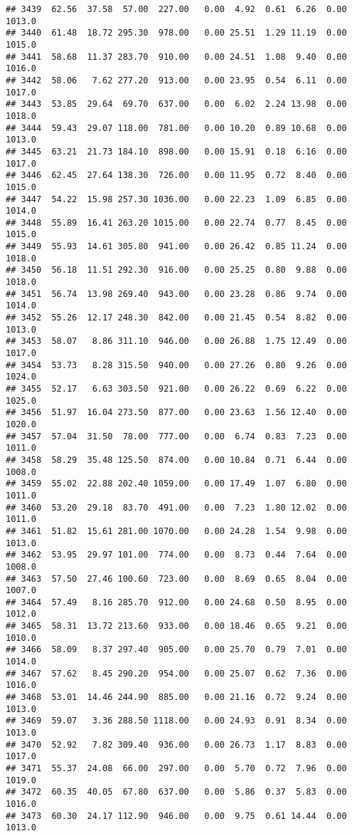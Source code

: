 \documentclass{article}\usepackage{graphicx, color}
\makeatletter
\newenvironment{kframe}{%
 \def\at@end@of@kframe{}%
 \ifinner\ifhmode%
  \def\at@end@of@kframe{\end{minipage}}%
  \begin{minipage}{\columnwidth}%
 \fi\fi%
 \def\FrameCommand##1{\hskip\@totalleftmargin \hskip-\fboxsep
 \colorbox{shadecolor}{##1}\hskip-\fboxsep
     \hskip-\linewidth \hskip-\@totalleftmargin \hskip\columnwidth}%
 \MakeFramed {\advance\hsize-\width
   \@totalleftmargin\z@ \linewidth\hsize
   \@setminipage}}%
 {\par\unskip\endMakeFramed%
 \at@end@of@kframe}
\newenvironment{knitrout}{}{} %
\makeatother
\begin{document}
\begin{knitrout}
\begin{kframe}
\begin{verbatim}
## 3439  62.56  37.58  57.00  227.00   0.00  4.92  0.61  6.26  0.00 1013.0
## 3440  61.48  18.72 295.30  978.00   0.00 25.51  1.29 11.19  0.00 1015.0
## 3441  58.68  11.37 283.70  910.00   0.00 24.51  1.08  9.40  0.00 1016.0
## 3442  58.06   7.62 277.20  913.00   0.00 23.95  0.54  6.11  0.00 1017.0
## 3443  53.85  29.64  69.70  637.00   0.00  6.02  2.24 13.98  0.00 1018.0
## 3444  59.43  29.07 118.00  781.00   0.00 10.20  0.89 10.68  0.00 1013.0
## 3445  63.21  21.73 184.10  898.00   0.00 15.91  0.18  6.16  0.00 1017.0
## 3446  62.45  27.64 138.30  726.00   0.00 11.95  0.72  8.40  0.00 1015.0
## 3447  54.22  15.98 257.30 1036.00   0.00 22.23  1.09  6.85  0.00 1014.0
## 3448  55.89  16.41 263.20 1015.00   0.00 22.74  0.77  8.45  0.00 1015.0
## 3449  55.93  14.61 305.80  941.00   0.00 26.42  0.85 11.24  0.00 1018.0
## 3450  56.18  11.51 292.30  916.00   0.00 25.25  0.80  9.88  0.00 1018.0
## 3451  56.74  13.98 269.40  943.00   0.00 23.28  0.86  9.74  0.00 1014.0
## 3452  55.26  12.17 248.30  842.00   0.00 21.45  0.54  8.82  0.00 1013.0
## 3453  58.07   8.86 311.10  946.00   0.00 26.88  1.75 12.49  0.00 1017.0
## 3454  53.73   8.28 315.50  940.00   0.00 27.26  0.80  9.26  0.00 1024.0
## 3455  52.17   6.63 303.50  921.00   0.00 26.22  0.69  6.22  0.00 1025.0
## 3456  51.97  16.04 273.50  877.00   0.00 23.63  1.56 12.40  0.00 1020.0
## 3457  57.04  31.50  78.00  777.00   0.00  6.74  0.83  7.23  0.00 1011.0
## 3458  58.29  35.48 125.50  874.00   0.00 10.84  0.71  6.44  0.00 1008.0
## 3459  55.02  22.88 202.40 1059.00   0.00 17.49  1.07  6.80  0.00 1011.0
## 3460  53.20  29.18  83.70  491.00   0.00  7.23  1.80 12.02  0.00 1011.0
## 3461  51.82  15.61 281.00 1070.00   0.00 24.28  1.54  9.98  0.00 1013.0
## 3462  53.95  29.97 101.00  774.00   0.00  8.73  0.44  7.64  0.00 1008.0
## 3463  57.50  27.46 100.60  723.00   0.00  8.69  0.65  8.04  0.00 1007.0
## 3464  57.49   8.16 285.70  912.00   0.00 24.68  0.50  8.95  0.00 1012.0
## 3465  58.31  13.72 213.60  933.00   0.00 18.46  0.65  9.21  0.00 1010.0
## 3466  58.09   8.37 297.40  905.00   0.00 25.70  0.79  7.01  0.00 1014.0
## 3467  57.62   8.45 290.20  954.00   0.00 25.07  0.62  7.36  0.00 1016.0
## 3468  53.01  14.46 244.90  885.00   0.00 21.16  0.72  9.24  0.00 1013.0
## 3469  59.07   3.36 288.50 1118.00   0.00 24.93  0.91  8.34  0.00 1013.0
## 3470  52.92   7.82 309.40  936.00   0.00 26.73  1.17  8.83  0.00 1017.0
## 3471  55.37  24.08  66.00  297.00   0.00  5.70  0.72  7.96  0.00 1019.0
## 3472  60.35  40.05  67.80  637.00   0.00  5.86  0.37  5.83  0.00 1016.0
## 3473  60.30  24.17 112.90  946.00   0.00  9.75  0.61 14.44  0.00 1013.0

\end{verbatim}
\end{kframe}
\end{knitrout}
\end{document}
